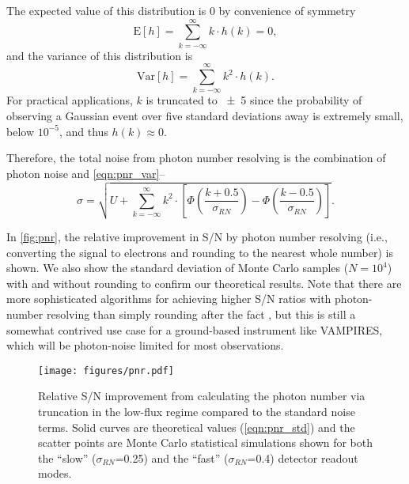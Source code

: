 The expected value of this distribution is 0 by convenience of symmetry
\begin{equation}
    \mathrm{E}[h] = \sum_{k=-\infty}^{\infty}{ k \cdot h(k)} = 0,
\end{equation}
and the variance of this distribution is
\begin{equation}
\label{eqn:pnr_var}
    \mathrm{Var}[h] = \sum_{k=-\infty}^{\infty}{ k^2\cdot h(k)}.
\end{equation}
For practical applications, $k$ is truncated to \num{\pm5} since the probability of observing a Gaussian event over five standard deviations away is extremely small, below $10^{-5}$, and thus $h(k)\approx0$.

Therefore, the total noise from photon number resolving is the combination of photon noise and \autoref{eqn:pnr_var}--
\begin{equation}
    \label{eqn:pnr_std}
    \sigma = \sqrt{U + \sum_{k=-\infty}^{\infty}{ k^2\cdot \left[\Phi\left(\frac{k + 0.5}{\sigma_{RN}} \right) - \Phi\left(\frac{k - 0.5}{\sigma_{RN}}\right)\right]}}.
\end{equation}


In \autoref{fig:pnr}, the relative improvement in S/N by photon number resolving (i.e., converting the signal to electrons and rounding to the nearest whole number) is shown. We also show the standard deviation of Monte Carlo samples ($N=10^4$) with and without rounding to confirm our theoretical results. Note that there are more sophisticated algorithms for achieving higher S/N ratios with photon-number resolving than simply rounding after the fact \citep[see][]{harpsoe_bayesian_2012}, but this is still a somewhat contrived use case for a ground-based instrument like VAMPIRES, which will be photon-noise limited for most observations.

\begin{figure}
    \centering
    \texttt{[image: figures/pnr.pdf]}
    \caption{Relative S/N improvement from calculating the photon number via truncation in the low-flux regime compared to the standard noise terms. Solid curves are theoretical values (\autoref{eqn:pnr_std}) and the scatter points are Monte Carlo statistical simulations shown for both the ``slow'' ($\sigma_{RN}$=\SI{0.25}{\electron}) and the ``fast''  ($\sigma_{RN}$=\SI{0.4}{\electron})  detector readout modes.\label{fig:pnr}}
\end{figure}
